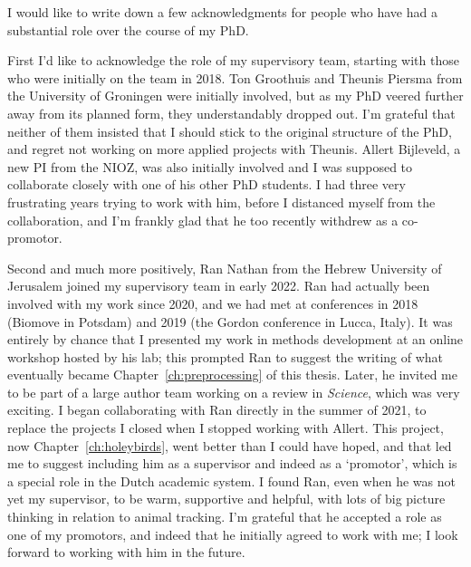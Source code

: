 \label{ch:ack}


\bigskip

\begingroup
\let\clearpage\relax
\let\cleardoublepage\relax
\let\cleardoublepage\relax

I would like to write down a few acknowledgments for people who have had a substantial role over the course of my PhD.

First I'd like to acknowledge the role of my supervisory team, starting with those who were initially on the team in 2018.
Ton Groothuis and Theunis Piersma from the University of Groningen were initially involved, but as my PhD veered further away from its planned form, they understandably dropped out.
I'm grateful that neither of them insisted that I should stick to the original structure of the PhD, and regret not working on more applied projects with Theunis.
Allert Bijleveld, a new PI from the NIOZ, was also initially involved and I was supposed to collaborate closely with one of his other PhD students.
I had three very frustrating years trying to work with him, before I distanced myself from the collaboration, and I'm frankly glad that he too recently withdrew as a co-promotor.

Second and much more positively, Ran Nathan from the Hebrew University of Jerusalem joined my supervisory team in early 2022.
Ran had actually been involved with my work since 2020, and we had met at conferences in 2018 (Biomove in Potsdam) and 2019 (the Gordon conference in Lucca, Italy).
It was entirely by chance that I presented my work in methods development at an online workshop hosted by his lab; this prompted Ran to suggest the writing of what eventually became Chapter~\ref{ch:preprocessing} of this thesis.
Later, he invited me to be part of a large author team working on a review in \textit{Science}, which was very exciting.
I began collaborating with Ran directly in the summer of 2021, to replace the projects I closed when I stopped working with Allert.
This project, now Chapter~\ref{ch:holeybirds}, went better than I could have hoped, and that led me to suggest including him as a supervisor and indeed as a `promotor', which is a special role in the Dutch academic system.
I found Ran, even when he was not yet my supervisor, to be warm, supportive and helpful, with lots of big picture thinking in relation to animal tracking.
I'm grateful that he accepted a role as one of my promotors, and indeed that he initially agreed to work with me; I look forward to working with him in the future.

